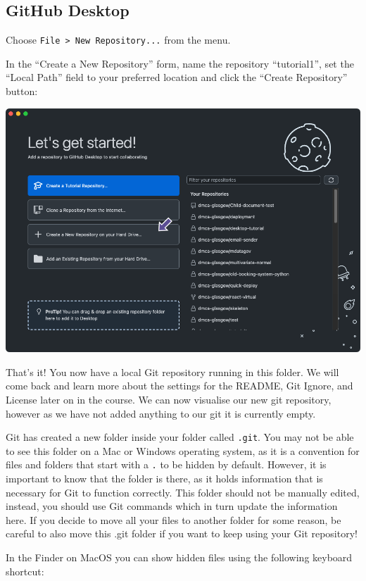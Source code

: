 \documentclass[
  letterpaper,
  DIV=11,
  numbers=noendperiod]{scrartcl}
\begin{document}
\subsection{GitHub Desktop}

Choose \texttt{File\ \textgreater{}\ New\ Repository...} from the menu.

In the ``Create a New Repository'' form, name the repository
``tutorial1'', set the ``Local Path'' field to your preferred location
and click the ``Create Repository'' button:

\includegraphics{images/image8.png}

That's it! You now have a local Git repository running in this folder.
We will come back and learn more about the settings for the README, Git
Ignore, and License later on in the course. We can now visualise our new
git repository, however as we have not added anything to our git it is
currently empty.

Git has created a new folder inside your folder called \texttt{.git}.
You may not be able to see this folder on a Mac or Windows operating
system, as it is a convention for files and folders that start with a
\texttt{.} to be hidden by default. However, it is important to know
that the folder is there, as it holds information that is necessary for
Git to function correctly. This folder should not be manually edited,
instead, you should use Git commands which in turn update the
information here. If you decide to move all your files to another folder
for some reason, be careful to also move this .git folder if you want to
keep using your Git repository!

In the Finder on MacOS you can show hidden files using the following
keyboard shortcut:
\end{document}
